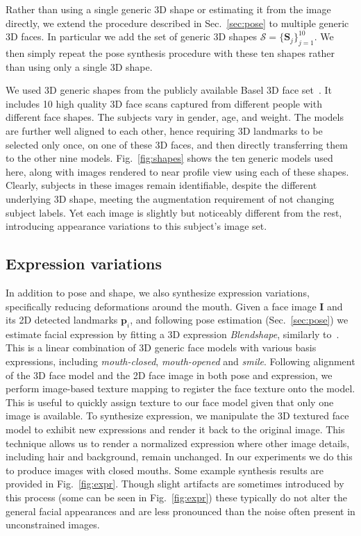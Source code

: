\documentclass[runningheads]{llncs}
\def\mbf#1{\mathbf{#1}}
\begin{document}
Rather than using a single generic 3D shape or estimating it from the image directly, we extend the procedure described in Sec.~\ref{sec:pose} to multiple generic 3D faces. In particular we add the set of generic 3D shapes $\mathcal{S} = \{ \mbf{S}_j \}_{j=1}^{10}$. We then simply repeat the pose synthesis procedure with these ten shapes rather than using only a single 3D shape. 

We used 3D generic shapes from the publicly available Basel 3D face set~\cite{bfm2009}. It includes 10 high quality 3D face scans captured from different people with different face shapes. The subjects vary in gender, age, and weight. The models are further well aligned to each other, hence requiring 3D landmarks to be selected only once, on one of these 3D faces, and then directly transferring them to the other nine models. Fig.~\ref{fig:shapes} shows the ten generic models used here, along with images rendered to near profile view using each of these shapes. Clearly, subjects in these images remain identifiable, despite the different underlying 3D shape, meeting the augmentation requirement of not changing subject labels. Yet each image is slightly but noticeably different from the rest, introducing  appearance variations to this subject's image set.


\subsection{Expression variations}\label{sec:expressions}
In addition to pose and shape, we also synthesize expression variations, specifically reducing deformations around the mouth. Given a face image $\mbf{I}$ and its 2D detected landmarks $\mbf{p}_i$, and following pose estimation (Sec.~\ref{sec:pose}) we estimate facial expression by fitting a 3D expression {\em Blendshape}, similarly to~\cite{blendshapes}. 
This  is a linear combination of 3D generic face models with various basis expressions, including {\em mouth-closed}, {\em mouth-opened} and {\em smile}. 
Following alignment of the 3D face model and the 2D face image in both pose and expression, we perform image-based texture mapping to register the face texture onto the model. This is useful to quickly assign texture to our face model given that only one image is available. To synthesize expression, we manipulate the 3D textured face model to exhibit new expressions and render it back to the original image. This technique allows us to render a normalized expression where other image details, including hair and background, remain unchanged. In our experiments we do this to produce images with closed mouths. Some example synthesis results are provided in Fig.~\ref{fig:expr}. Though slight artifacts are sometimes introduced by this process (some can be seen in Fig.~\ref{fig:expr}) these typically do not alter the general facial appearances and are less pronounced than the noise often present in unconstrained images.
\end{document}
